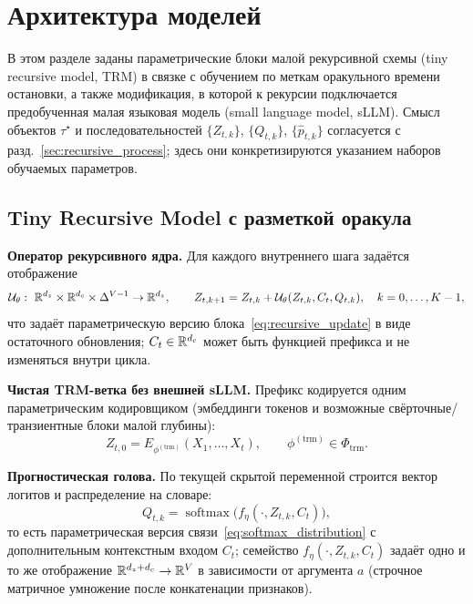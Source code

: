 \section{Архитектура моделей}\label{sec:model_architecture}

В этом разделе заданы параметрические блоки малой рекурсивной схемы (tiny recursive model, TRM) в
связке с обучением по меткам оракульного времени остановки, а также модификация, в которой к
рекурсии подключается предобученная малая языковая модель (small language model, sLLM). Смысл
объектов \(\tau^\star\) и последовательностей \(\{Z_{t,k}\}\), \(\{Q_{t,k}\}\), \(\{\widehat
p_{t,k}\}\) согласуется с разд.~\ref{sec:recursive_process}; здесь они конкретизируются указанием
наборов обучаемых параметров.

\subsection{Tiny Recursive Model с разметкой оракула}\label{ssec:arch_trm_oracle}

\textbf{Оператор рекурсивного ядра.} Для каждого внутреннего шага задаётся отображение
\begin{equation}
  \mathcal U_{\theta}:\ \R^{d_z}\times\R^{d_c}\times\Delta^{V-1}\rightarrow\R^{d_z},
  \qquad
  Z_{t,k+1}=Z_{t,k}+\mathcal U_{\theta}(Z_{t,k},C_t,Q_{t,k}), \quad k=0,\ldots,K-1,
  \label{eq:trm_residual_kernel}
\end{equation}
что задаёт параметрическую версию блока~\eqref{eq:recursive_update} в виде остаточного обновления;
\(C_t\in\mathbb{R}^{d_c}\) может быть функцией префикса и не изменяться внутри цикла.

\textbf{Чистая TRM-ветка без внешней sLLM.} Префикс кодируется одним параметрическим кодировщиком
(эмбеддинги токенов и возможные свёрточные/транзиентные блоки малой глубины):
\begin{equation}
  Z_{t,0}=E_{\phi^{(\mathrm{trm})}}(X_{1},\ldots,X_t),\qquad 
  \phi^{(\mathrm{trm})}\in\Phi_{\mathrm{trm}} .
  \label{eq:trm_embed_prefix}
\end{equation}

\textbf{Прогностическая голова.} По текущей скрытой переменной строится вектор логитов и
распределение на словаре:
\begin{equation}
  Q_{t,k}=\operatorname{softmax}\bigl(f_{\eta}(\cdot,Z_{t,k},C_t)\bigr),
  \label{eq:lm_head_general}
\end{equation}
то есть параметрическая версия связи~\eqref{eq:softmax_distribution} с дополнительным контекстным
входом \(C_t\); семейство \(f_{\eta}(\cdot,Z_{t,k},C_t)\) задаёт одно и то же отображение
\(\mathbb{R}^{d_z+d_c}\rightarrow\mathbb{R}^V\) в зависимости от аргумента \(a\) (строчное матричное умножение
после конкатенации признаков).

